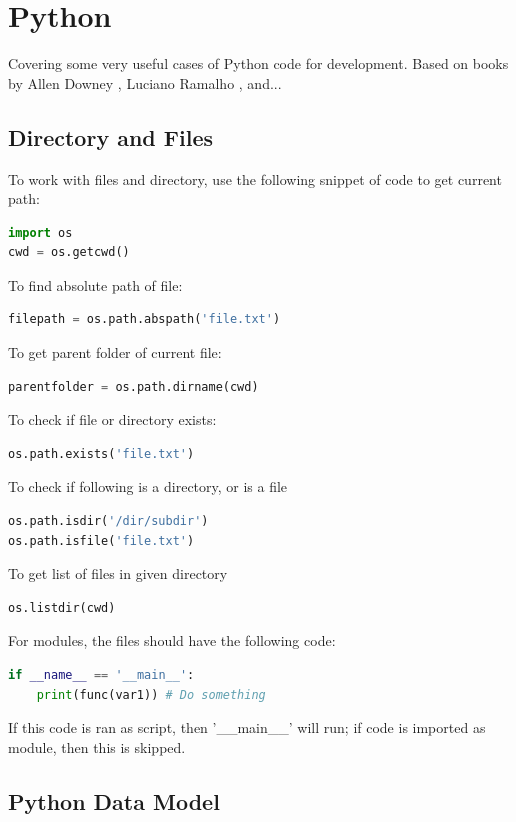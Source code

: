 \section{Python}

Covering some very useful cases of Python code for development. Based on books by Allen Downey \citep{downey-2015}, Luciano Ramalho \citep{ramalho-2015}, and...

\subsection{Directory and Files}

To work with files and directory, use the following snippet of code to get current path:
\begin{lstlisting}[language=Python]
import os
cwd = os.getcwd()
\end{lstlisting}
To find absolute path of file:
\begin{lstlisting}[language=Python]
filepath = os.path.abspath('file.txt')
\end{lstlisting}
To get parent folder of current file:
\begin{lstlisting}[language=Python]
parentfolder = os.path.dirname(cwd)
\end{lstlisting}
To check if file or directory exists:
\begin{lstlisting}[language=Python]
os.path.exists('file.txt')
\end{lstlisting}
To check if following is a directory, or is a file
\begin{lstlisting}[language=Python]
os.path.isdir('/dir/subdir')
os.path.isfile('file.txt')
\end{lstlisting}
To get list of files in given directory
\begin{lstlisting}[language=Python]
os.listdir(cwd)
\end{lstlisting}

For modules, the files should have the following code:
\begin{lstlisting}[language=Python]
if __name__ == '__main__':
	print(func(var1)) # Do something
\end{lstlisting}
If this code is ran as script, then '\_\_main\_\_' will run; if code is imported as module, then this is skipped.

\subsection{Python Data Model}


